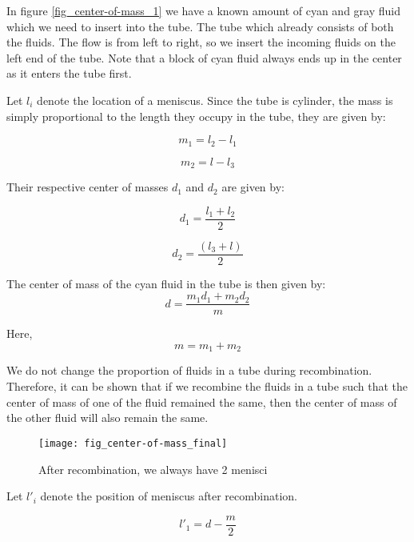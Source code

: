 	In figure \ref{fig_center-of-mass_1} we have a known amount of cyan and gray fluid which we need to insert into the tube. The tube which already consists of both the fluids. The flow is from left to right, so we insert the incoming fluids on the left end of the tube. Note that a block of cyan fluid always ends up in the center as it enters the tube first.
	
	Let $l_{i}$ denote the location of a meniscus. Since the tube is cylinder, the mass is simply proportional to the length they occupy in the tube, they are given by:
	
	\begin{equation}
		m_1 = l_2 - l_1 
	\end{equation}
	
	\begin{equation}
		m_2 = l - l_3
	\end{equation}
	
	Their respective center of masses $d_1$ and $d_2$ are given by:
	
	\begin{equation}	
		d_1 = \frac{l_1 + l_2}{2}
	\end{equation}
	
	\begin{equation}	
		d_2 = \frac{(l_3 + l)}{2}
	\end{equation}
	
	The center of mass of the cyan fluid in the tube is then given by:
	\begin{equation}
		d = \frac{m_1 d_1 + m_2 d_2}{m}
	\end{equation}
	
	Here,
	\begin{equation}
		m = m_1 + m_2
	\end{equation}
	
	
	We do not change the proportion of fluids in a tube during recombination. Therefore, it can be shown that if we recombine the fluids in a tube such that the center of mass of one of the fluid remained the same, then the center of mass of the other fluid will also remain the same.
	
	\begin{figure}[H]
		\centering
		\texttt{[image: fig\_center-of-mass\_final]}
		\caption{After recombination, we always have 2 menisci}
	\end{figure}
	
	Let ${l'}_i$ denote the position of meniscus after recombination.
	
	\begin{equation}
		{l'}_1 = d - \frac{m}{2}
	\end{equation}
	
